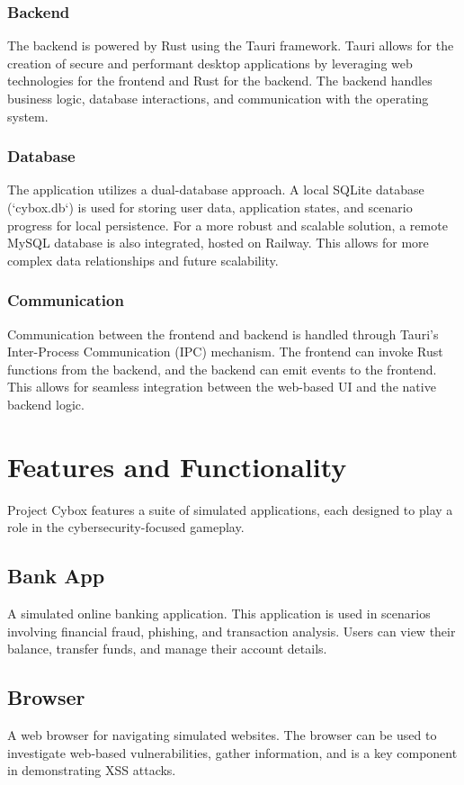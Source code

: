 \documentclass{report}
\begin{document}
\subsection{Backend}
The backend is powered by Rust using the Tauri framework. Tauri allows for the creation of secure and performant desktop applications by leveraging web technologies for the frontend and Rust for the backend. The backend handles business logic, database interactions, and communication with the operating system.

\subsection{Database}
The application utilizes a dual-database approach. A local SQLite database (`cybox.db`) is used for storing user data, application states, and scenario progress for local persistence. For a more robust and scalable solution, a remote MySQL database is also integrated, hosted on Railway. This allows for more complex data relationships and future scalability.

\subsection{Communication}
Communication between the frontend and backend is handled through Tauri's Inter-Process Communication (IPC) mechanism. The frontend can invoke Rust functions from the backend, and the backend can emit events to the frontend. This allows for seamless integration between the web-based UI and the native backend logic.

\chapter{Features and Functionality}

Project Cybox features a suite of simulated applications, each designed to play a role in the cybersecurity-focused gameplay.

\section{Bank App}
A simulated online banking application. This application is used in scenarios involving financial fraud, phishing, and transaction analysis. Users can view their balance, transfer funds, and manage their account details.

\section{Browser}
A web browser for navigating simulated websites. The browser can be used to investigate web-based vulnerabilities, gather information, and is a key component in demonstrating XSS attacks.
\end{document}
